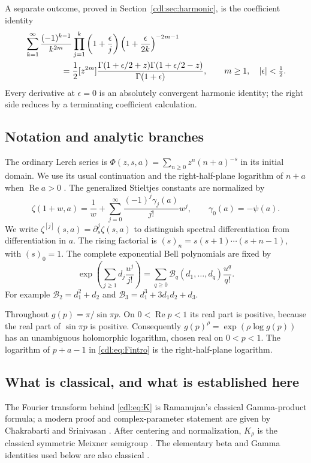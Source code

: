 \documentclass[11pt,letterpaper]{article}
\numberwithin{equation}{section}
\theoremstyle{definition}\newtheorem{definition}[theorem]{Definition}
\theoremstyle{remark}\newtheorem{remark}[theorem]{Remark}
\newcommand{\Rea}{\operatorname{Re}}\newcommand{\Ima}{\operatorname{Im}}
\newcommand{\B}{\mathcal B}\newcommand{\PP}{\mathcal P}
\begin{document}
A separate outcome, proved in Section~\ref{cdl:sec:harmonic}, is the
coefficient identity
\begin{equation}\label{cdl:eq:harmonicintro}
 \begin{split}
 &\sum_{k=1}^\infty\frac{(-1)^{k-1}}{k^{2m}}
 \prod_{j=1}^k\left(1+\frac\epsilon j\right)
 \left(1+\frac\epsilon{2k}\right)^{-2m-1}\\
 &\hspace{15mm}=\frac12[z^{2m}]
 \frac{\Gamma(1+\epsilon/2+z)\Gamma(1+\epsilon/2-z)}
      {\Gamma(1+\epsilon)},\qquad m\ge1,\quad |\epsilon|<\tfrac12.
 \end{split}
\end{equation}
Every derivative at $\epsilon=0$ is an absolutely convergent harmonic
identity; the right side reduces by a terminating coefficient calculation.

\subsection{Notation and analytic branches}
The ordinary Lerch series is
$\Phi(z,s,a)=\sum_{n\ge0}z^n(n+a)^{-s}$ in its initial domain.
We use its usual continuation and the right-half-plane logarithm of
$n+a$ when $\Rea a>0$ \cite{DLMFLerch,DLMFZeta}.
The generalized Stieltjes constants are normalized by
\begin{equation}\label{cdl:eq:stieltjes}
 \zeta(1+w,a)=\frac1w+
 \sum_{j=0}^\infty\frac{(-1)^j\gamma_j(a)}{j!}w^j,
 \qquad \gamma_0(a)=-\psi(a).
\end{equation}
We write $\zeta^{[j]}(s,a)=\partial_s^j\zeta(s,a)$ to distinguish
spectral differentiation from differentiation in $a$. The rising factorial
is $(s)_n=s(s+1)\cdots(s+n-1)$, with $(s)_0=1$.
The complete exponential Bell polynomials are fixed by
\begin{equation}\label{cdl:eq:Bell}
 \exp\left(\sum_{j\ge1}d_j\frac{u^j}{j!}\right)
 =\sum_{q\ge0}\B_q(d_1,\ldots,d_q)\frac{u^q}{q!}.
\end{equation}
For example $\B_2=d_1^2+d_2$ and
$\B_3=d_1^3+3d_1d_2+d_3$.

Throughout $g(p)=\pi/\sin\pi p$. On $0<\Rea p<1$ its real part is
positive, because the real part of $\sin\pi p$ is positive. Consequently
$g(p)^\rho=\exp(\rho\log g(p))$ has an unambiguous holomorphic logarithm,
chosen real on $0<p<1$. The logarithm of $p+a-1$ in
\eqref{cdl:eq:Fintro} is the right-half-plane logarithm.

\subsection{What is classical, and what is established here}
The Fourier transform behind \eqref{cdl:eq:K} is Ramanujan's classical
Gamma-product formula; a modern proof and complex-parameter statement
are given by Chakrabarti and Srinivasan \cite{CS}. After centering and
normalization, $K_\rho$ is the classical symmetric Meixner semigroup
\cite{Schoutens}. The elementary beta and Gamma identities used below
are also classical \cite{DLMFBeta,DLMFGamma}.
\end{document}
